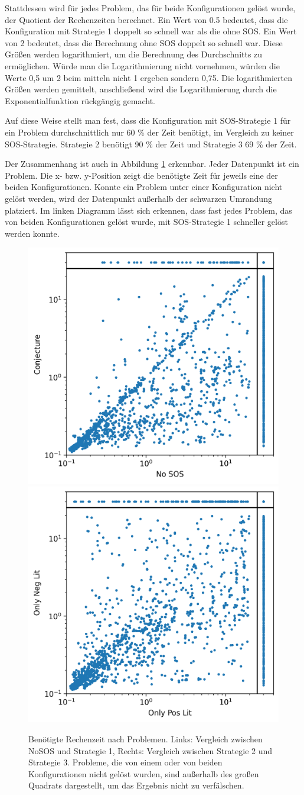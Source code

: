 		Stattdessen wird für jedes Problem, das für beide Konfigurationen gelöst wurde, der Quotient der Rechenzeiten berechnet. Ein Wert von 0.5 bedeutet, dass die Konfiguration mit Strategie 1 doppelt so schnell war als die ohne SOS. Ein Wert von 2 bedeutet, dass die Berechnung ohne SOS doppelt so schnell war. Diese Größen werden logarithmiert, um die Berechnung des Durchschnitts zu ermöglichen. Würde man die Logarithmierung nicht vornehmen, würden die Werte 0,5 um 2 beim mitteln nicht 1 ergeben sondern 0,75. Die logarithmierten Größen werden gemittelt, anschließend wird die Logarithmierung durch die Exponentialfunktion rückgängig gemacht.
		
		Auf diese Weise stellt man fest, dass die Konfiguration mit SOS-Strategie 1 für ein Problem durchschnittlich nur 60 \% der Zeit benötigt, im Vergleich zu keiner SOS-Strategie. Strategie 2 benötigt 90 \% der Zeit und Strategie 3 69 \% der Zeit.
		
		
		Der Zusammenhang ist auch in Abbildung \ref{fig:directcompare} erkennbar. Jeder Datenpunkt ist ein Problem. Die x- bzw. y-Position zeigt die benötigte Zeit für jeweils eine der beiden Konfigurationen. Konnte ein Problem unter einer Konfiguration nicht gelöst werden, wird der Datenpunkt außerhalb der schwarzen Umrandung platziert. Im linken Diagramm lässt sich erkennen, dass fast jedes Problem, das von beiden Konfigurationen gelöst wurde, mit SOS-Strategie 1 schneller gelöst werden konnte.
		
		\begin{figure}
			\centering
			\includegraphics[width=0.45\linewidth]{images/Diagram/directCompare1_2}
			\includegraphics[width=0.45\linewidth]{images/Diagram/directCompare2_3}
			\caption{Benötigte Rechenzeit nach Problemen. Links: Vergleich zwischen NoSOS und Strategie 1, Rechts: Vergleich zwischen Strategie 2 und Strategie 3. Probleme, die von einem oder von beiden Konfigurationen nicht gelöst wurden, sind außerhalb des großen Quadrats dargestellt, um das Ergebnis nicht zu verfälschen.}
			\label{fig:directcompare}
		\end{figure}

